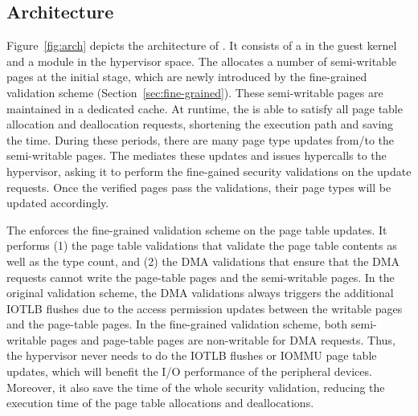 \subsection{\name Architecture}
Figure~\ref{fig:arch} depicts the architecture of \name. It consists of a \cache in the guest kernel and a \name module in the hypervisor space.
The \cache allocates a number of semi-writable pages at the initial stage,  which are newly introduced by the fine-grained validation scheme (Section~\ref{sec:fine-grained}).
These semi-writable pages are maintained in a dedicated cache.
At runtime, the \cache is able to satisfy all page table allocation and deallocation requests, shortening the execution path and saving the time.
During these periods, there are many page type updates from/to the semi-writable pages.
The \cache mediates these updates and issues hypercalls to the hypervisor, asking it to perform the fine-gained security validations on the update requests.
Once the verified pages pass the validations, their page types will be updated accordingly.

The \module enforces the fine-grained validation scheme on the page table updates.
It performs (1) the page table validations that validate the page table contents as well as the type count, and (2) the DMA validations that ensure that the DMA requests cannot write the page-table pages and the semi-writable pages.
In the original validation scheme, the DMA validations always triggers the additional IOTLB flushes due to the access permission updates between the writable pages and the page-table pages.
In the fine-grained validation scheme, both semi-writable pages and page-table pages are non-writable for DMA requests.
Thus, the hypervisor never needs to do the IOTLB flushes or IOMMU page table updates, which will benefit the I/O performance of the peripheral devices.
Moreover, it also save the time of the whole security validation, reducing the execution time of the page table allocations and deallocations.

